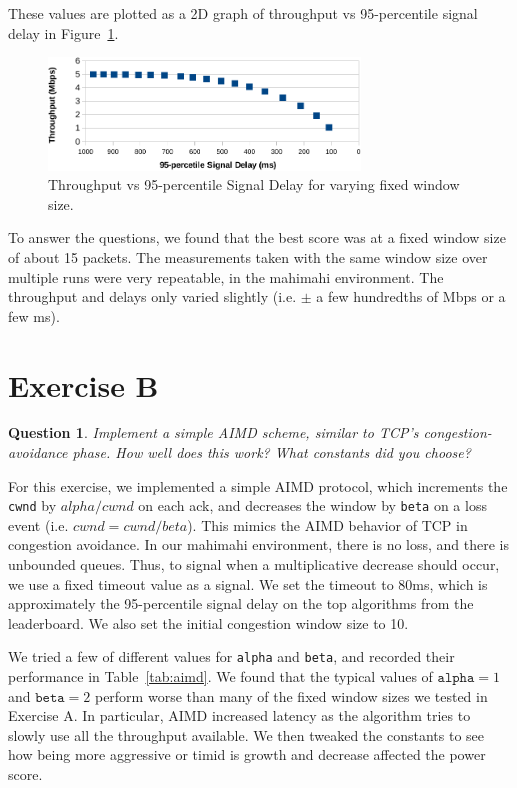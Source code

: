 \documentclass[twoside]{article}
\newtheorem{question}[theorem]{Question}
\begin{document}
These values are plotted as a 2D graph of throughput vs 95-percentile signal
delay in Figure~\ref{fig:throughput_delay}.

\begin{figure}[h]
  \centering
  \includegraphics[height=3cm]{./img/exa_throughput_delay.pdf}
  \caption{Throughput vs 95-percentile Signal Delay for varying fixed window size.}
  \label{fig:throughput_delay}
\end{figure}

To answer the questions, we found that the best score was at a fixed window
size of about 15 packets. The measurements taken with the same window size
over multiple runs were very repeatable, in the mahimahi environment. The
throughput and delays only varied slightly (i.e. $\pm$ a few hundredths of Mbps
or a few ms).

\vfill
\pagebreak

\section*{Exercise B}
\begin{question}
  Implement a simple AIMD scheme, similar to TCP's congestion-avoidance phase.
  How well does this work? What constants did you choose?
\end{question}

For this exercise, we implemented a simple AIMD protocol, which increments the
\texttt{cwnd} by $alpha/cwnd$ on each ack, and decreases the window by
\texttt{beta} on a loss event (i.e. $cwnd = cwnd / beta$).
This mimics the AIMD behavior of TCP in congestion avoidance.
In our mahimahi environment, there is no loss, and there is unbounded queues.
Thus, to signal when a multiplicative decrease should occur, we use a fixed
timeout value as a signal. We set the timeout to 80ms, which is approximately
the 95-percentile signal delay on the top algorithms from the leaderboard.
We also set the initial congestion window size to 10.

We tried a few of different values for \texttt{alpha} and \texttt{beta},
and recorded their performance in Table~\ref{tab:aimd}.
We found that the typical values of $\texttt{alpha} = 1$ and $\texttt{beta} = 2$
perform worse than many of the fixed window sizes we tested in Exercise A.
In particular, AIMD increased latency as the algorithm tries to slowly use
all the throughput available. We then tweaked the constants to see how being
more aggressive or timid is growth and decrease affected the power score.
\end{document}
